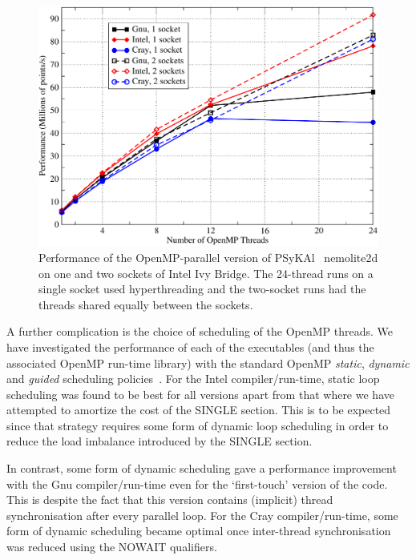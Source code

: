 \documentclass[journal]{IEEEtran}
\newlength{\picwidth}
\newcommand{\psykal}{{PS}y{KA}l\ }
\begin{document}
\begin{figure}
\centering
\includegraphics[width=\picwidth]{1and2sockets}
\caption{Performance of the OpenMP-parallel version of \psykal
  nemolite2d on one and two sockets of Intel Ivy Bridge. The 24-thread
  runs on a single socket used hyperthreading and the two-socket runs
  had the threads shared equally between the sockets.}
\label{FIG_omp_2socks}
\end{figure}

A further complication is the choice of scheduling of the OpenMP
threads.  We have investigated the performance of each of the
executables (and thus the associated OpenMP run-time library) with the
standard OpenMP {\it static}, {\it dynamic} and {\it guided}
scheduling policies~\cite{openmp_standard}. For the Intel
compiler/run-time, static loop scheduling was found to be best for all
versions apart from that where we have attempted to amortize the cost
of the SINGLE section. This is to be expected since that strategy
requires some form of dynamic loop scheduling in order to reduce the
load imbalance introduced by the SINGLE section.

In contrast, some form of dynamic scheduling gave a performance
improvement with the Gnu compiler/run-time even for the `first-touch'
version of the code. This is despite the fact that this version
contains (implicit) thread synchronisation after every parallel loop.
For the Cray compiler/run-time, some form of dynamic scheduling became
optimal once inter-thread synchronisation was reduced using the NOWAIT
qualifiers.
\end{document}
